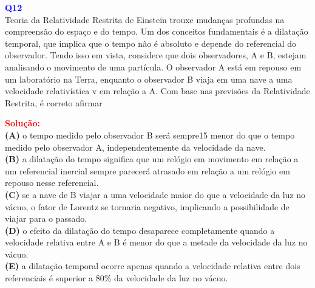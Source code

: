 \documentclass[a4paper,12pt]{article}
\begin{document}
\begin{flushleft}
\textbf{\textcolor{blue}{\Large Q12}}\\
Teoria da Relatividade Restrita de Einstein
trouxe mudanças profundas na compreensão do
espaço e do tempo. Um dos conceitos
fundamentais é a dilatação temporal, que implica
que o tempo não é absoluto e depende do
referencial do observador.
Tendo isso em vista, considere que dois
observadores, A e B, estejam analisando o
movimento de uma partícula. O observador A está
em repouso em um laboratório na Terra, enquanto
o observador B viaja em uma nave a uma
velocidade relativística v em relação a A. Com
base nas previsões da Relatividade Restrita, é
correto afirmar 

\textcolor{red}{\textbf{Solução:}}\\

\textbf{(A)} o tempo medido pelo observador B será sempre15
menor do que o tempo medido pelo observador
A, independentemente da velocidade da nave.\\
\colorbox{green!50}{\textbf{(B)}} a dilatação do tempo significa que um relógio em
movimento em relação a um referencial inercial
sempre parecerá atrasado em relação a um
relógio em repouso nesse referencial.\\
\textbf{(C)} se a nave de B viajar a uma velocidade maior do
que a velocidade da luz no vácuo, o fator de
Lorentz se tornaria negativo, implicando a
possibilidade de viajar para o passado.\\
\textbf{(D)} o efeito da dilatação do tempo desaparece
completamente quando a velocidade relativa
entre A e B é menor do que a metade da
velocidade da luz no vácuo.\\
\textbf{(E)} a dilatação temporal ocorre apenas quando a
velocidade relativa entre dois referenciais é
superior a 80\% da velocidade da luz no vácuo.

\end{flushleft}
\end{document}
